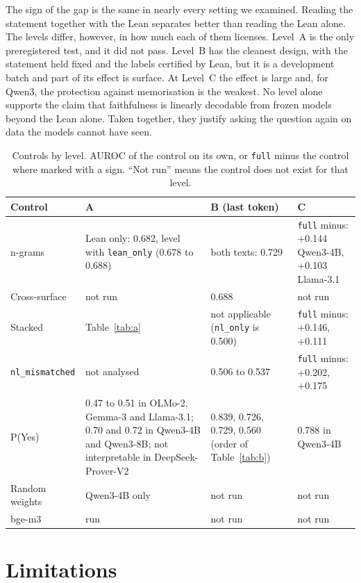 \documentclass[10pt]{article}
\newcommand{\vr}[1]{\texttt{#1}}
\begin{document}
The sign of the gap is the same in nearly every setting we examined. Reading the statement together with the Lean
separates better than reading the Lean alone. The levels differ, however, in how much each of them licenses.
Level~A is the only preregistered test, and it did not pass. Level~B has the cleanest design, with the statement
held fixed and the labels certified by Lean, but it is a development batch and part of its effect is surface. At
Level~C the effect is large and, for Qwen3, the protection against memorisation is the weakest. No level alone
supports the claim that faithfulness is linearly decodable from frozen models beyond the Lean alone.
Taken together, they justify asking the question again on data the models cannot have seen.

\begin{table}[h]
\centering
\caption{Controls by level. AUROC of the control on its own, or \vr{full} minus the control where marked with a sign. ``Not run'' means the control does not exist for that level.}
\label{tab:controlesnivel}
\vspace{2pt}
{\small
\begin{tabularx}{\linewidth}{@{}lXXX@{}}
\toprule
Control & A & B (last token) & C\\
\midrule
n-grams & Lean only: 0.682, level with \vr{lean\_only} (0.678 to 0.688) & both texts: 0.729 & \vr{full} minus: +0.144 Qwen3-4B, +0.103 Llama-3.1\\
Cross-surface & not run & 0.688 & not run\\
Stacked & Table~\ref{tab:a} & not applicable (\vr{nl\_only} is 0.500) & \vr{full} minus: +0.146, +0.111\\
\vr{nl\_mismatched} & not analysed & 0.506 to 0.537 & \vr{full} minus: +0.202, +0.175\\
P(Yes) & 0.47 to 0.51 in OLMo-2, Gemma-3 and Llama-3.1; 0.70 and 0.72 in Qwen3-4B and Qwen3-8B; not interpretable in DeepSeek-Prover-V2 & 0.839, 0.726, 0.729, 0.560 (order of Table~\ref{tab:b}) & 0.788 in Qwen3-4B\\
Random weights & Qwen3-4B only & not run & not run\\
bge-m3 & run & not run & not run\\
\bottomrule
\end{tabularx}}
\end{table}

\section{Limitations}
\end{document}
